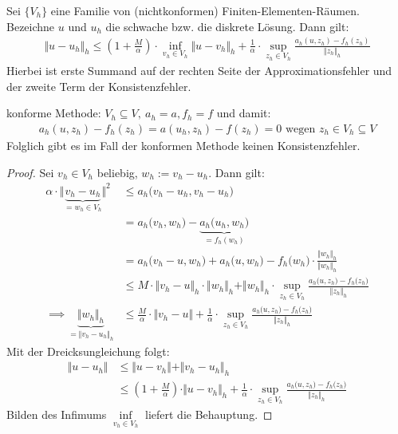 \begin{theorem}\label{theorem5.1ZweitesLemmaStrang}\enter
	Sei $\lbrace V_h\rbrace$ eine Familie von (nichtkonformen) Finiten-Elementen-Räumen. Bezeichne $u$ und $u_h$ die schwache bzw. die diskrete Lösung. Dann gilt:
	\begin{align*}
		\big\Vert u-u_h\big\Vert_h\leq\left(1+\frac{M}{\alpha}\right)\cdot\inf\limits_{v_h\in V_h}\big\Vert u-v_h\big\Vert_h
		+\frac{1}{\alpha}\cdot\sup\limits_{z_h\in V_h}\frac{a_h(u,z_h)-f_h(z_h)}{\Vert z_h\Vert_h}
	\end{align*}
	Hierbei ist erste Summand auf der rechten Seite der Approximationsfehler und der zweite Term der Konsistenzfehler.
\end{theorem}

\begin{bemerkung}
	konforme Methode: $V_h\subseteq V,~a_h=a,f_h=f$ und damit:
	\begin{align*}
		a_h(u,z_h)-f_h(z_h)=a(u_h,z_h)-f(z_h)=0\text{ wegen } z_h\in V_h\subseteq V
	\end{align*}
	Folglich gibt es im Fall der konformen Methode keinen Konsistenzfehler.
\end{bemerkung}

\begin{proof}
	Sei $v_h\in V_h$ beliebig, $w_h:=v_h-u_h$. Dann gilt:
	\begin{align*}
		\alpha\cdot\big\Vert\underbrace{v_h-u_h}_{=w_h\in V_h}\big\Vert^2
		&\leq a_h\big(v_h-u_h,v_h-u_h\big)\\
		&=a_h\big(v_h,w_h\big)-\underbrace{a_h\big(u_h,w_h\big)}_{=f_h(w_h)}\\
		&=a_h\big(v_h-u,w_h\big)+a_h\big(u,w_h\big)-f_h\big(w_h\big)\cdot\frac{\Vert w_h\Vert_h}{\Vert w_h\Vert_h}\\
		&\leq M\cdot\big\Vert v_h-u\big\Vert_h\cdot\big\Vert w_h\big\Vert_h+\Vert w_h\Vert_h\cdot\sup\limits_{z_h\in V_h}\frac{a_h\big(u,z_h\big)-f_h\big(z_h\big)}{\Vert z_h\Vert_h}\\
		\implies
		\underbrace{\Vert w_h\Vert_h}_{=\Vert v_h-u_h\Vert_h}&\leq\frac{M}{\alpha}\cdot\big\Vert v_h-u\big\Vert+\frac{1}{\alpha}\cdot\sup\limits_{z_h\in V_h}\frac{a_h\big(u,z_h\big)-f_h\big(z_h\big)}{\Vert z_h\Vert_h}
	\end{align*}
	Mit der Dreicksungleichung folgt:
	\begin{align*}
		\Vert u-u_h\Vert
		&\leq\Vert u-v_h\Vert+\Vert v_h-u_h\Vert_h\\
		&\leq\left(1+\frac{M}{\alpha}\right)\cdot\Vert u-v_h\Vert_h+\frac{1}{\alpha}\cdot\sup\limits_{z_h\in V_h}\frac{a_h\big(u,z_h\big)-f_h\big(z_h\big)}{\Vert z_h\Vert_h}
	\end{align*}
	Bilden des Infimums $\inf\limits_{v_h\in V_h}$ liefert die Behauptung.
\end{proof}

